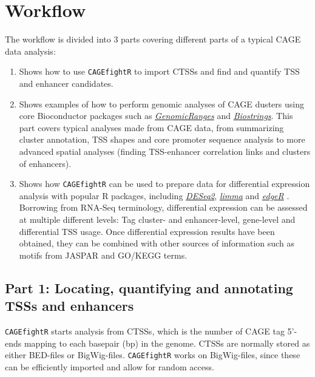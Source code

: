 \documentclass[9pt,a4paper,]{extarticle}
\begin{document}
\section{Workflow}\label{workflow}

The workflow is divided into 3 parts covering different parts of a typical CAGE data analysis:

\begin{enumerate}
\def\labelenumi{\arabic{enumi}.}
\item
  Shows how to use \texttt{CAGEfightR} to import CTSSs and find and quantify TSS and enhancer candidates.
\item
  Shows examples of how to perform genomic analyses of CAGE dusters using core Bioconductor packages such as \emph{\href{https://bioconductor.org/packages/3.8/GenomicRanges}{GenomicRanges}} and \emph{\href{https://bioconductor.org/packages/3.8/Biostrings}{Biostrings}}. This part covers typical analyses made from CAGE data, from summarizing cluster annotation, TSS shapes and core promoter sequence analysis to more advanced spatial analyses (finding TSS-enhancer correlation links and clusters of enhancers).
\item
  Shows how \texttt{CAGEfightR} can be used to prepare data for differential expression analysis with popular R packages, including \emph{\href{https://bioconductor.org/packages/3.8/DESeq2}{DESeq2}}, \emph{\href{https://bioconductor.org/packages/3.8/limma}{limma}} and \emph{\href{https://bioconductor.org/packages/3.8/edgeR}{edgeR}} \citep{Love2014, Ritchie2015a, Robinson2010}. Borrowing from RNA-Seq terminology, differential expression can be assessed at multiple different levels: Tag cluster- and enhancer-level, gene-level and differential TSS usage\citep{Soneson2016}. Once differential expression results have been obtained, they can be combined with other sources of information such as motifs from JASPAR \citep{Mathelier2016} and GO/KEGG terms\citep[Hancock2014; Gene2019;][]{Qi2016}.
\end{enumerate}

\subsection{Part 1: Locating, quantifying and annotating TSSs and enhancers}\label{part-1-locating-quantifying-and-annotating-tsss-and-enhancers}

\texttt{CAGEfightR} starts analysis from CTSSs, which is the number of CAGE tag 5'-ends mapping to each basepair (bp) in the genome. CTSSs are normally stored as either BED-files or BigWig-files. \texttt{CAGEfightR} works on BigWig-files, since these can be efficiently imported and allow for random access.
\end{document}
